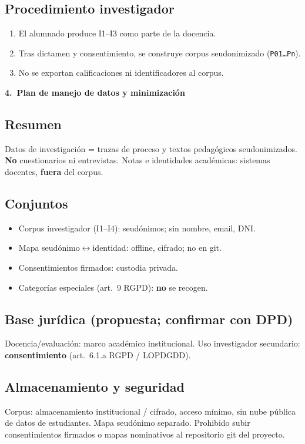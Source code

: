 \documentclass[11pt,a4paper]{scrartcl}
\newcommand{\AnnexTitle}[1]{%
  \clearpage
  \LogoRow
  \begin{center}{\Large\sffamily\bfseries #1}\end{center}
  \vspace{0.4em}
  \noindent{\color{rulegray}\hrule height 0.4pt}
  \vspace{0.5em}
}
\begin{document}
\subsection*{Procedimiento investigador}
\begin{enumerate}
  \item El alumnado produce I1--I3 como parte de la docencia.
  \item Tras dictamen y consentimiento, se construye corpus seudonimizado (\texttt{P01\ldots Pn}).
  \item No se exportan calificaciones ni identificadores al corpus.
\end{enumerate}

\AnnexTitle{4.\ Plan de manejo de datos y minimización}

\subsection*{Resumen}
Datos de investigación = trazas de proceso y textos pedagógicos seudonimizados.
\textbf{No} cuestionarios ni entrevistas. Notas e identidades académicas:
sistemas docentes, \textbf{fuera} del corpus.

\subsection*{Conjuntos}
\begin{itemize}
  \item Corpus investigador (I1--I4): seudónimos; sin nombre, email, DNI.
  \item Mapa seudónimo$\leftrightarrow$identidad: offline, cifrado; no en git.
  \item Consentimientos firmados: custodia privada.
  \item Categorías especiales (art.~9 RGPD): \textbf{no} se recogen.
\end{itemize}

\subsection*{Base jurídica (propuesta; confirmar con DPD)}
Docencia/evaluación: marco académico institucional.
Uso investigador secundario: \textbf{consentimiento} (art.~6.1.a RGPD / LOPDGDD).

\subsection*{Almacenamiento y seguridad}
Corpus: almacenamiento institucional / cifrado, acceso mínimo, sin nube pública
de datos de estudiantes. Mapa seudónimo separado. Prohibido subir consentimientos
firmados o mapas nominativos al repositorio git del proyecto.
\end{document}
